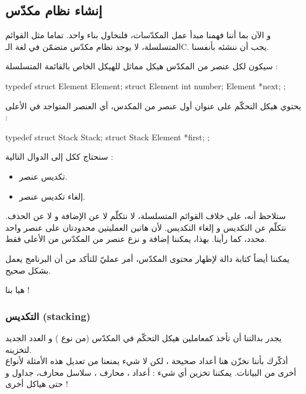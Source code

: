 \subsection{إنشاء نظام مكدّس}

و الآن بما أننا فهمنا مبدأ عمل المكدّسات، فلنحاول بناء واحد. تماما مثل القوائم المتسلسلة، لا يوجد نظام مكدّس متضمّن في لغة الـ\textenglish{C}.
يجب أن ننشئه بأنفسنا.

سيكون لكل عنصر من المكدّس هيكل مماثل للهيكل الخاص بالقائمة المتسلسلة :

\begin{Csource}
typedef struct Element Element;
struct Element
{
	int number;
	Element *next;
};
\end{Csource}

يحتوي هيكل التحكّم على عنوان أول عنصر من المكدس، أي العنصر المتواجد في الأعلى :

\begin{Csource}
typedef struct Stack Stack;
struct Stack
{
	Element *first;
};
\end{Csource}

سنحتاج ككل إلى الدوال التالية :

\begin{itemize}
	\item تكديس  عنصر.
	\item إلغاء تكديس عنصر.
\end{itemize}

ستلاحظ أنه، على خلاف القوائم المتسلسلة، لا نتكلّم لا عن الإضافة و لا عن الحذف. نتكلّم عن التكديس و إلغاء التكديس. لأن هاتين العمليتين محدودتان على عنصر واحد محدد، كما رأينا. بهذا، يمكننا إضافة و نزع عنصر من المكدّس من الأعلى فقط.

يمكننا أيضاً كتابة دالة لإظهار محتوى المكدّس، أمر عمليّ للتأكد من أن البرنامج يعمل بشكل صحيح.

هيا بنا  !

\subsubsection{التكديس (\textenglish{stacking})}

يجدر بدالتنا
أن تأخذ كمعاملين هيكل التحكّم في المكدّس (من نوع
)
و العدد الجديد لتخزينه.\\
أذكّرك بأننا نخزّن هنا أعداد صحيحة
،
لكن لا شيء يمنعنا من تعديل هذه الأمثلة لأنواع أخرى من البيانات. يمكننا تخزين أي شيء : أعداد
،
محارف
،
سلاسل محارف، جداول و حتى هياكل أخرى !


